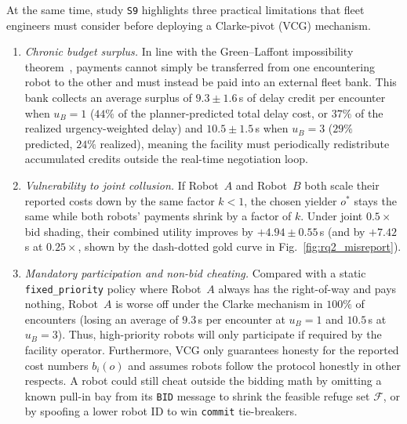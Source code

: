 At the same time, study \texttt{S9} highlights three practical limitations that fleet engineers must consider before deploying a Clarke-pivot (VCG) mechanism.
\begin{enumerate}
\item \emph{Chronic budget surplus.} In line with the Green--Laffont impossibility theorem~\cite{green1977characterization}, payments cannot simply be transferred from one encountering robot to the other and must instead be paid into an external fleet bank. This bank collects an average surplus of $9.3\pm 1.6$\,s of delay credit per encounter when $u_B=1$ ($44\%$ of the planner-predicted total delay cost, or $37\%$ of the realized urgency-weighted delay) and $10.5\pm 1.5$\,s when $u_B=3$ ($29\%$ predicted, $24\%$ realized), meaning the facility must periodically redistribute accumulated credits outside the real-time negotiation loop.
\item \emph{Vulnerability to joint collusion.} If Robot~$A$ and Robot~$B$ both scale their reported costs down by the same factor $k<1$, the chosen yielder $o^\ast$ stays the same while both robots' payments shrink by a factor of $k$. Under joint $0.5\times$ bid shading, their combined utility improves by $+4.94\pm 0.55$\,s (and by $+7.42$\,s at $0.25\times$, shown by the dash-dotted gold curve in Fig.~\ref{fig:rq2_misreport}).
\item \emph{Mandatory participation and non-bid cheating.} Compared with a static \texttt{fixed\_priority} policy where Robot~$A$ always has the right-of-way and pays nothing, Robot~$A$ is worse off under the Clarke mechanism in $100\%$ of encounters (losing an average of $9.3$\,s per encounter at $u_B=1$ and $10.5$\,s at $u_B=3$). Thus, high-priority robots will only participate if required by the facility operator. Furthermore, VCG only guarantees honesty for the reported cost numbers $b_i(o)$ and assumes robots follow the protocol honestly in other respects. A robot could still cheat outside the bidding math by omitting a known pull-in bay from its \texttt{BID} message to shrink the feasible refuge set $\mathcal{F}$, or by spoofing a lower robot ID to win \texttt{commit} tie-breakers.
\end{enumerate}

